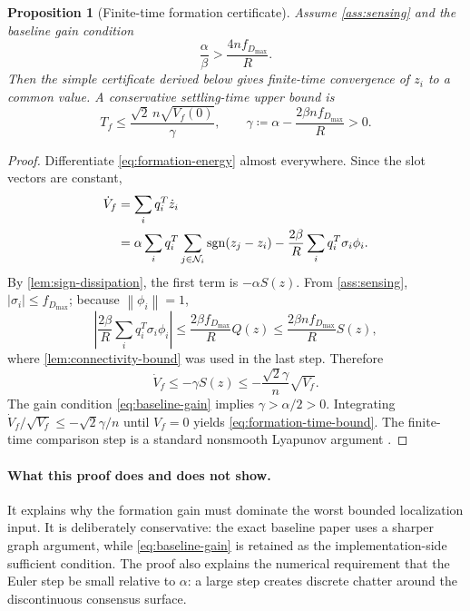 \documentclass[11pt]{article}
\newtheorem{proposition}[theorem]{Proposition}
\newcommand{\N}{\mathcal{N}}
\newcommand{\sgn}{\operatorname{sgn}}
\newcommand{\norm}[1]{\left\lVert #1\right\rVert}
\begin{document}
\begin{proposition}[Finite-time formation certificate]\label{prop:formation}
Assume \cref{ass:sensing} and the baseline gain condition
\begin{equation}\label{eq:baseline-gain}
    \frac{\alpha}{\beta}>\frac{4nf_{D_{\max}}}{R}.
\end{equation}
Then the simple certificate derived below gives finite-time convergence of $z_i$ to a common value. A conservative settling-time upper bound is
\begin{equation}\label{eq:formation-time-bound}
    T_f\leq \frac{\sqrt{2}\,n\sqrt{V_f(0)}}{\gamma},
    \qquad
    \gamma\coloneqq\alpha-\frac{2\beta n f_{D_{\max}}}{R}>0.
\end{equation}
\end{proposition}

\begin{proof}
Differentiate \eqref{eq:formation-energy} almost everywhere. Since the slot vectors are constant,
\begin{align}
    \dot V_f
    &=\sum_iq_i^T\dot z_i\notag\\
    &=\alpha\sum_iq_i^T\sum_{j\in\N_i}\sgn(z_j-z_i)
      -\frac{2\beta}{R}\sum_iq_i^T\sigma_i\phi_i.\label{eq:vf-derivative-start}
\end{align}
By \cref{lem:sign-dissipation}, the first term is $-\alpha S(z)$. From \cref{ass:sensing}, $|\sigma_i|\leq f_{D_{\max}}$; because $\norm{\phi_i}=1$,
\begin{equation*}
    \left|\frac{2\beta}{R}\sum_iq_i^T\sigma_i\phi_i\right|
    \leq\frac{2\beta f_{D_{\max}}}{R}Q(z)
    \leq\frac{2\beta nf_{D_{\max}}}{R}S(z),
\end{equation*}
where \cref{lem:connectivity-bound} was used in the last step. Therefore
\begin{equation}\label{eq:vf-dissipation}
    \dot V_f\leq-\gamma S(z)
    \leq-\frac{\sqrt{2}\gamma}{n}\sqrt{V_f}.
\end{equation}
The gain condition \eqref{eq:baseline-gain} implies $\gamma>\alpha/2>0$. Integrating $\dot V_f/\sqrt{V_f}\leq-\sqrt{2}\gamma/n$ until $V_f=0$ yields \eqref{eq:formation-time-bound}. The finite-time comparison step is a standard nonsmooth Lyapunov argument \cite{bhat2000}.
\end{proof}

\paragraph{What this proof does and does not show.}
It explains why the formation gain must dominate the worst bounded localization input. It is deliberately conservative: the exact baseline paper uses a sharper graph argument, while \eqref{eq:baseline-gain} is retained as the implementation-side sufficient condition. The proof also explains the numerical requirement that the Euler step be small relative to $\alpha$: a large step creates discrete chatter around the discontinuous consensus surface.
\end{document}
